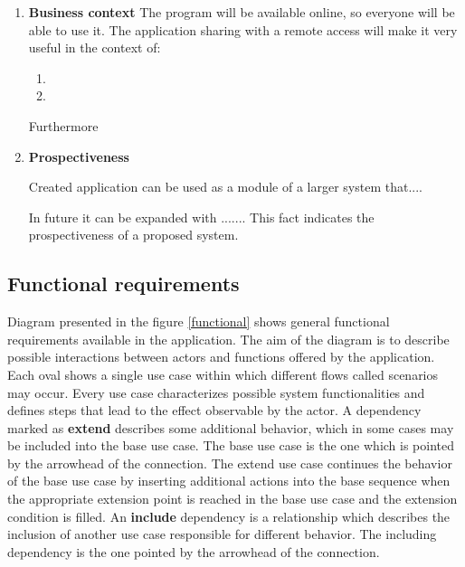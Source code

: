 \begin{enumerate}

\item \textbf{Business context} The program will be available online, so everyone will be able to use it. The application sharing with a remote access will make it very useful in the context of:

\begin{enumerate}

\item 

\item 

\end{enumerate}

Furthermore 

\item \textbf{Prospectiveness}

Created application can be used as a module of a larger system that.... 

In future it can be expanded with ....... This fact indicates the prospectiveness of a proposed system. 

\end{enumerate}

\subsection{Functional requirements}


Diagram presented in the figure \ref{functional} shows general functional requirements available in the application. The aim of the diagram is to describe possible interactions between actors and functions offered by the application. Each oval shows a single use case within which different flows called scenarios may occur. Every use case characterizes possible system functionalities and defines steps that lead to the effect observable by the actor. A dependency marked as \textbf{extend} describes some additional behavior, which in some cases may be included into the base use case. 
The base use case is the one which is pointed by the arrowhead of the connection. The extend use case continues the behavior of the base use case by inserting additional actions into the base sequence when the appropriate extension point is reached in the base use case and the extension condition is filled. An \textbf{include} dependency is a relationship which describes the inclusion of another use case responsible for different behavior. The including dependency is the one pointed by the arrowhead of the connection.


